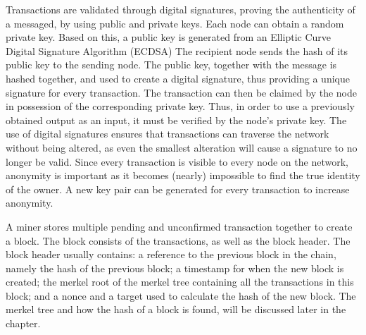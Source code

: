 Transactions are validated through digital signatures, proving the authenticity of a messaged, by using public and private keys. Each node can obtain a random private key. Based on this, a public key is generated from an Elliptic Curve Digital Signature Algorithm (ECDSA) %
The recipient node sends the hash of its public key to the sending node. The public key, together with the message is hashed together, and used to create a digital signature, thus providing a unique signature for every transaction. The transaction can then be claimed by the node in possession of the corresponding private key. Thus, in order to use a previously obtained output as an input, it must be verified by the node's private key. The use of digital signatures ensures that transactions can traverse the network without being altered, as even the smallest alteration will cause a signature to no longer be valid. Since every transaction is visible to every node on the network, anonymity is important as it becomes (nearly) %
impossible to find the true identity of the owner. A new key pair can be generated for every transaction to increase anonymity.

A miner stores multiple pending and unconfirmed transaction together to create a block. The block consists of the transactions, as well as the block header. The block header usually contains: a reference to the previous block in the chain, namely the hash of the previous block; a timestamp for when the new block is created; the merkel root of the merkel tree containing all the transactions in this block; and  a nonce and a target used to calculate the hash of the new block. The merkel tree and how the hash of a block is found, will be discussed later in the chapter.

